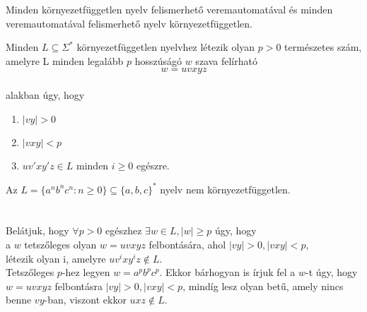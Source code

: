 \begin{frame}
\begin{tcolorbox}[squeezed title={Tétel: Környezetfüggetlen nyelv és veremautomata}]
Minden környezetfüggetlen nyelv felismerhető veremautomatával és minden veremautomatával felismerhető nyelv környezetfüggetlen.
\end{tcolorbox}

\begin{tcolorbox}[title={Tétel: Pumpáló lemma környezetfüggetlen nyelvre}]
Minden $L \subseteq {\Sigma}^*$ környezetfüggetlen nyelvhez létezik olyan $p > 0$ természetes szám, amelyre L minden legalább $p$ hosszúságó $w$ szava felírható $$w = uvxyz$$\\
alakban úgy, hogy\\
\begin{enumerate}
\item $|vy| > 0$
\item $|vxy| < p$
\item $uv'xy'z \in L$ minden $i \geq 0$ egészre.
\end{enumerate}

\end{tcolorbox}
\end{frame}

\begin{frame}
\begin{tcolorbox}[title={Tétel: Példa nem környezetfüggetlen nyelvre 1}]
Az $L = \{a^nb^nc^n : n \geq 0 \} \subseteq \{a, b, c\}^*$ nyelv nem környezetfüggetlen.\\
\tcblower
\msmallskip
\underline{}\\
\mmedskip
\\
Belátjuk, hogy ${\forall}p > 0$ egészhez ${\exists}w \in L, |w| \geq p$ úgy, hogy\\
a $w$ tetszőleges olyan $w = uvxyz$ felbontására, ahol $|vy| > 0, |vxy| < p$,\\
létezik olyan i, amelyre $uv^ixy^iz \notin L$.\\
\mbigskip
Tetszőleges $p$-hez legyen $w = a^pb^pc^p$. Ekkor bárhogyan is írjuk fel a $w$-t úgy, hogy $w = uvxyz$ felbontásra $|vy| > 0, |vxy| < p$, mindíg lesz olyan betű, amely nincs benne $vy$-ban, viszont ekkor $uxz \notin L$.
\end{tcolorbox}
\end{frame}


